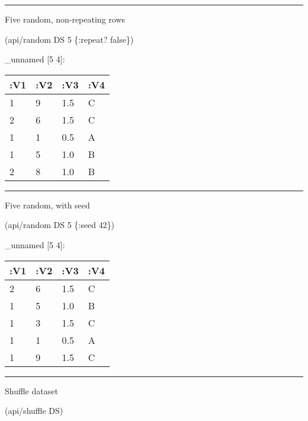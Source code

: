 \documentclass[]{article}
\newenvironment{Shaded}{\begin{snugshade}}{\end{snugshade}}
\newcommand{\AttributeTok}[1]{\textcolor[rgb]{0.77,0.63,0.00}{#1}}
\newcommand{\DecValTok}[1]{\textcolor[rgb]{0.00,0.00,0.81}{#1}}
\newcommand{\NormalTok}[1]{#1}
\newcommand{\VariableTok}[1]{\textcolor[rgb]{0.00,0.00,0.00}{#1}}
\begin{document}
\begin{center}\rule{0.5\linewidth}{0.5pt}\end{center}

Five random, non-repeating rows

\begin{Shaded}
\begin{Highlighting}[]
\NormalTok{(api/random DS }\DecValTok{5}\NormalTok{ \{}\AttributeTok{:repeat}\NormalTok{? }\VariableTok{false}\NormalTok{\})}
\end{Highlighting}
\end{Shaded}

\_unnamed {[}5 4{]}:

\begin{longtable}[]{@{}llll@{}}
\toprule
:V1 & :V2 & :V3 & :V4\tabularnewline
\midrule
\endhead
1 & 9 & 1.5 & C\tabularnewline
2 & 6 & 1.5 & C\tabularnewline
1 & 1 & 0.5 & A\tabularnewline
1 & 5 & 1.0 & B\tabularnewline
2 & 8 & 1.0 & B\tabularnewline
\bottomrule
\end{longtable}

\begin{center}\rule{0.5\linewidth}{0.5pt}\end{center}

Five random, with seed

\begin{Shaded}
\begin{Highlighting}[]
\NormalTok{(api/random DS }\DecValTok{5}\NormalTok{ \{}\AttributeTok{:seed} \DecValTok{42}\NormalTok{\})}
\end{Highlighting}
\end{Shaded}

\_unnamed {[}5 4{]}:

\begin{longtable}[]{@{}llll@{}}
\toprule
:V1 & :V2 & :V3 & :V4\tabularnewline
\midrule
\endhead
2 & 6 & 1.5 & C\tabularnewline
1 & 5 & 1.0 & B\tabularnewline
1 & 3 & 1.5 & C\tabularnewline
1 & 1 & 0.5 & A\tabularnewline
1 & 9 & 1.5 & C\tabularnewline
\bottomrule
\end{longtable}

\begin{center}\rule{0.5\linewidth}{0.5pt}\end{center}

Shuffle dataset

\begin{Shaded}
\begin{Highlighting}[]
\NormalTok{(api/shuffle DS)}
\end{Highlighting}
\end{Shaded}
\end{document}
